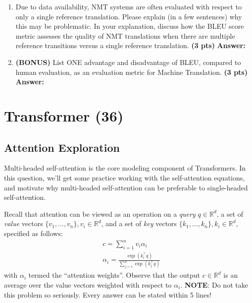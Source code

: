 \documentclass{assignment format}
\newenvironment{answer}{
    {\bf Answer:} \begingroup\color{red}
}{\endgroup}%
\begin{document}
\begin{enumerate}[label=(\alph*)]
\begin{enumerate}[label=(\roman*)]
    Please compute the BLEU scores for $\mathbf{c}_1$ and $\mathbf{c}_2$. Let $\lambda_i=0.5$ for $i\in\{1,2\}$ and $\lambda_i=0$ for $i\in\{3,4\}$ (\textbf{this means we ignore 3-grams and 4-grams}, i.e., don't compute $p_3$ or $p_4$). When computing BLEU scores, show your working (i.e., show your computed values for $p_1$, $p_2$, $len(c)$, $len(r)$ and $BP$). Note that the BLEU scores can be expressed between 0 and 1 or between 0 and 100. The code is using the 0 to 100 scale while in this question we are using the \textbf{0 to 1} scale. \textbf{(6 pts)}
    \begin{answer}
    \end{answer}
    \item Due to data availability, NMT systems are often evaluated with respect to only a single reference translation. Please explain (in a few sentences) why this may be problematic. In your explanation, discuss how the BLEU score metric assesses the quality of NMT translations when there are multiple reference transitions versus a single reference translation. \textbf{(3 pts)}
    \begin{answer}
    \end{answer}
    \item \textbf{(BONUS)} List ONE advantage and disadvantage of BLEU, compared to human evaluation, as an evaluation metric for Machine Translation. \textbf{(3 pts)}
    \begin{answer}
    \end{answer}
    \end{enumerate}
\end{enumerate}


\section{Transformer (36)}
\subsection{Attention Exploration}

Multi-headed self-attention is the core modeling component of Transformers.
In this question, we'll get some practice working with the self-attention equations, and motivate why multi-headed self-attention can be preferable to single-headed self-attention.

Recall that attention can be viewed as an operation on a \textit{query} $q\in\mathbb{R}^d$, a set of \textit{value} vectors $\{v_1,\dots,v_n\}, v_i\in\mathbb{R}^d$, and a set of \textit{key} vectors $\{k_1,\dots,k_n\}, k_i \in \mathbb{R}^d$, specified as follows:
\begin{align}
&c = \sum_{i=1}^{n} v_i \alpha_i \\
&\alpha_i = \frac{\exp(k_i^\top q)}{\sum_{j=1}^{n} \exp(k_j^\top q)}
\end{align} 
with $\alpha_i$ termed the ``attention weights''. 
Observe that the output $c\in\mathbb{R}^d$ is an average over the value vectors weighted with respect to $\alpha_i$.
\newline
\textbf{NOTE}: Do not take this problem so seriously. Every answer can be stated within 5 lines! 
\end{document}
